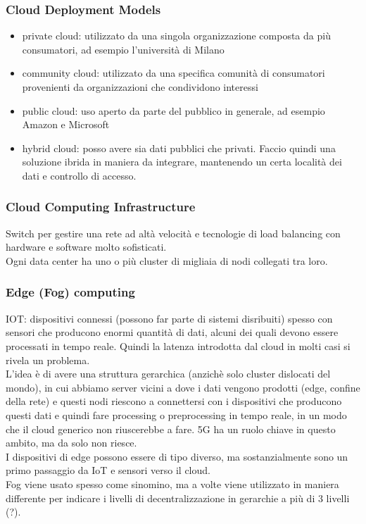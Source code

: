 \subsubsection{Cloud Deployment Models}
\begin{itemize}
    \item private cloud: utilizzato da una singola organizzazione composta da più consumatori, ad esempio l'università di Milano
    \item community cloud: utilizzato da una specifica comunità di consumatori provenienti da organizzazioni che condividono interessi
    \item public cloud: uso aperto da parte del pubblico in generale, ad esempio Amazon e Microsoft
    \item hybrid cloud: posso avere sia dati pubblici che privati. Faccio quindi una soluzione ibrida in maniera da integrare, mantenendo un certa località dei dati e controllo di accesso.
\end{itemize}

\subsubsection{Cloud Computing Infrastructure}
Switch per gestire una rete ad altà velocità e tecnologie di load balancing con hardware e software molto sofisticati.\\
Ogni data center ha uno o più cluster di migliaia di nodi collegati tra loro.

\subsubsection{Edge (Fog) computing}
IOT: dispositivi connessi (possono far parte di sistemi disribuiti) spesso con sensori che producono enormi quantità di dati, alcuni dei quali devono essere processati in tempo reale. Quindi la latenza introdotta dal cloud in molti casi si rivela un problema. \\
L'idea è di avere una struttura gerarchica (anzichè solo cluster dislocati del mondo), in cui abbiamo server vicini a dove i dati vengono prodotti (edge, confine della rete) e questi nodi riescono a connettersi con i dispositivi che producono questi dati e quindi fare processing o preprocessing in tempo reale, in un modo che il cloud generico non riuscerebbe a fare.
5G ha un ruolo chiave in questo ambito, ma da solo non riesce. \\
I dispositivi di edge possono essere di tipo diverso, ma sostanzialmente sono un primo passaggio da IoT e sensori verso il cloud. \\
Fog viene usato spesso come sinomino, ma a volte viene utilizzato in maniera differente per indicare i livelli di decentralizzazione in gerarchie a più di 3 livelli (?).

